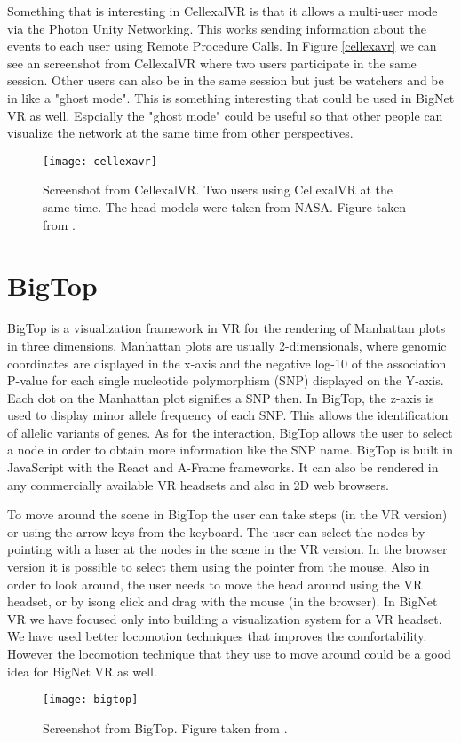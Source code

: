 Something that is interesting in CellexalVR is that it allows a multi-user mode via the Photon Unity Networking. This works sending information about the events to each user using Remote Procedure Calls. In Figure \ref{cellexavr} we can see an screenshot from CellexalVR where two users participate in the same session. Other users can also be in the same session but just be watchers and be in like a "ghost mode". This is something interesting that could be used in BigNet VR as well. Espcially the "ghost mode" could be useful so that other people can visualize the network at the same time from other perspectives.

\begin{figure}[h!]
    \centering%
    \texttt{[image: cellexavr]}
    \caption{Screenshot from CellexalVR. Two users using CellexalVR at the same time. The head models were taken from NASA. Figure taken from \cite{cellexalvr}.}
    \label{fig:cellexavr}
\end{figure}%

\section{BigTop}
BigTop is a visualization framework in VR for the rendering of Manhattan plots in three dimensions\cite{bigtop}. Manhattan plots are usually 2-dimensionals, where genomic coordinates are displayed in the x-axis and the negative log-10 of the association P-value for each single nucleotide polymorphism (SNP) displayed on the Y-axis. Each dot on the Manhattan plot signifies a SNP then. In BigTop, the z-axis is used to display minor allele frequency of each SNP. This allows the identification of allelic variants of genes. As for the interaction, BigTop allows the user to select a node in order to obtain more information like the SNP name. BigTop is built in JavaScript with the React and A-Frame frameworks. It can also be rendered in any commercially available VR headsets and also in 2D web browsers.

To move around the scene in BigTop the user can take steps (in the VR version) or using the arrow keys from the keyboard. The user can select the nodes by pointing with a laser at the nodes in the scene in the VR version. In the browser version it is possible to select them using the pointer from the mouse. Also in order to look around, the user needs to move the head around using the VR headset, or by isong click and drag with the mouse (in the browser). In BigNet VR we have focused only into building a visualization system for a VR headset. We have used better locomotion techniques that improves the comfortability. However the locomotion technique that they use to move around could be a good idea for BigNet VR as well.

\begin{figure}[h!]
    \centering%
    \texttt{[image: bigtop]}
    \caption{Screenshot from BigTop. Figure taken from \cite{bigtop}.}
    \label{fig:bigtop}
\end{figure}%
